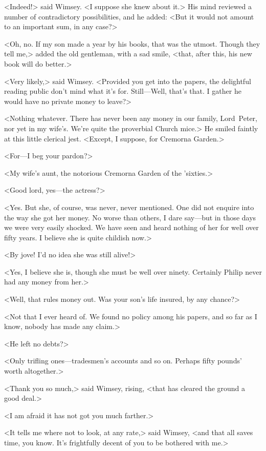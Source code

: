 <Indeed!> said Wimsey. <I suppose she knew about it.> His mind reviewed a number of contradictory possibilities, and he added: <But it would not amount to an important sum, in any case?>

<Oh, no. If my son made  a year by his books, that was the utmost. Though they tell me,> added the old gentleman, with a sad smile, <that, after this, his new book will do better.>

<Very likely,> said Wimsey. <Provided you get into the papers, the delightful reading public don't mind what it's for. Still—Well, that's that. I gather he would have no private money to leave?>

<Nothing whatever. There has never been any money in our family, Lord~Peter, nor yet in my wife's. We're quite the proverbial Church mice.> He smiled faintly at this little clerical jest. <Except, I suppose, for Cremorna Garden.>

<For—I beg your pardon?>

<My wife's aunt, the notorious Cremorna Garden of the 'sixties.>

<Good lord, yes—the actress?>

<Yes. But she, of course, was never, never mentioned. One did not enquire into the way she got her money. No worse than others, I dare say—but in those days we were very easily shocked. We have seen and heard nothing of her for well over fifty years. I believe she is quite childish now.>

<By jove! I'd no idea she was still alive!>

<Yes, I believe she is, though she must be well over ninety. Certainly Philip never had any money from her.>

<Well, that rules money out. Was your son's life insured, by any chance?>

<Not that I ever heard of. We found no policy among his papers, and so far as I know, nobody has made any claim.>

<He left no debts?>

<Only trifling ones—tradesmen's accounts and so on. Perhaps fifty pounds' worth altogether.>

<Thank you so much,> said Wimsey, rising, <that has cleared the ground a good deal.>

<I am afraid it has not got you much farther.>

<It tells me where not to look, at any rate,> said Wimsey, <and that all saves time, you know. It's frightfully decent of you to be bothered with me.>

